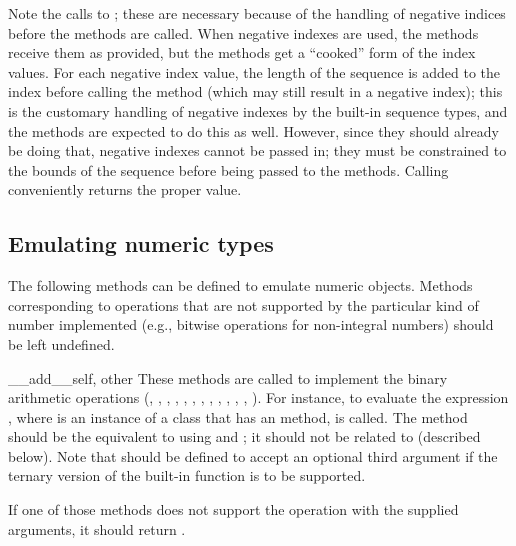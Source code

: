 Note the calls to ; these are necessary because of
the handling of negative indices before the
 methods are called.  When negative indexes are
used, the  methods receive them as provided, but
the  methods get a ``cooked'' form of the index
values.  For each negative index value, the length of the sequence is
added to the index before calling the method (which may still result
in a negative index); this is the customary handling of negative
indexes by the built-in sequence types, and the 
methods are expected to do this as well.  However, since they should
already be doing that, negative indexes cannot be passed in; they must
be constrained to the bounds of the sequence before being passed to
the  methods.
Calling  conveniently returns the proper value.


\subsection{Emulating numeric types\label{numeric-types}}

The following methods can be defined to emulate numeric objects.
Methods corresponding to operations that are not supported by the
particular kind of number implemented (e.g., bitwise operations for
non-integral numbers) should be left undefined.

\begin{methoddesc}{__add__}{self, other}
These methods are
called to implement the binary arithmetic operations (\code{+},
\code{-}, \code{*}, \code{//}, \code{\%},
,
, \code{**}, \code{<<},
\code{>>}, \code{\&}, \code{\^}, \code{|}).  For instance, to
evaluate the expression \code{+}, where  is an
instance of a class that has an  method,
 is called.  The 
method should be the equivalent to using  and
; it should not be related to 
(described below).  Note that
 should be defined to accept an optional third
argument if the ternary version of the built-in
 function is to be supported.

If one of those methods does not support the operation with the
supplied arguments, it should return .
\end{methoddesc}

